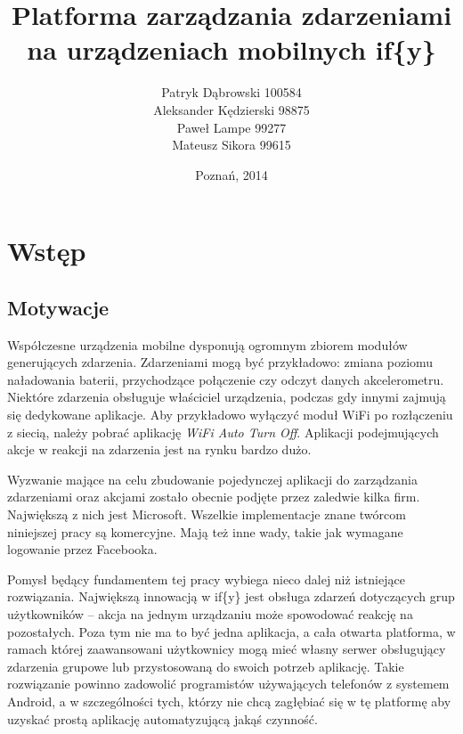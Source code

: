 \documentclass[11pt,a4paper,polish,thesis]{dcsbook}
\begin{document}
\author{Patryk Dąbrowski 100584\\ Aleksander Kędzierski 98875\\ Paweł Lampe 99277\\ Mateusz Sikora 99615}
\title{Platforma zarządzania zdarzeniami na urządzeniach mobilnych if\{y\}}
\date{Poznań, 2014}

\maketitle

\frontmatter

\tableofcontents{}

\mainmatter

\chapter{Wstęp}
\section{Motywacje}
Współczesne urządzenia mobilne dysponują ogromnym zbiorem modułów generujących zdarzenia. Zdarzeniami mogą być przykładowo: zmiana poziomu naładowania
baterii, przychodzące połączenie czy odczyt danych akcelerometru. Niektóre zdarzenia obsługuje właściciel urządzenia, podczas gdy innymi zajmują się dedykowane
aplikacje. Aby przykładowo wyłączyć moduł WiFi po rozłączeniu z siecią, należy pobrać aplikację \emph{WiFi Auto Turn Off}. Aplikacji podejmujących akcje w reakcji
na zdarzenia jest na rynku bardzo dużo.

Wyzwanie mające na celu zbudowanie pojedynczej aplikacji do zarządzania zdarzeniami oraz akcjami zostało obecnie podjęte przez zaledwie kilka firm. Największą z nich
jest Microsoft. Wszelkie implementacje znane twórcom niniejszej pracy są komercyjne. Mają też inne wady, takie jak wymagane logowanie przez Facebooka.

Pomysł będący fundamentem tej pracy wybiega nieco dalej niż istniejące rozwiązania. Największą innowacją w if\{y\} jest obsługa zdarzeń dotyczących grup użytkowników -- akcja na jednym urządzaniu może spowodować reakcję na pozostałych.
Poza tym nie ma to być jedna aplikacja, a cała otwarta platforma, w ramach której zaawansowani użytkownicy mogą mieć własny serwer obsługujący zdarzenia grupowe lub
przystosowaną do swoich potrzeb aplikację. Takie rozwiązanie powinno zadowolić programistów używających telefonów z systemem Android, a w szczególności tych, którzy nie chcą zagłębiać się w tę platformę aby uzyskać prostą aplikację automatyzującą jakąś czynność.
\end{document}

